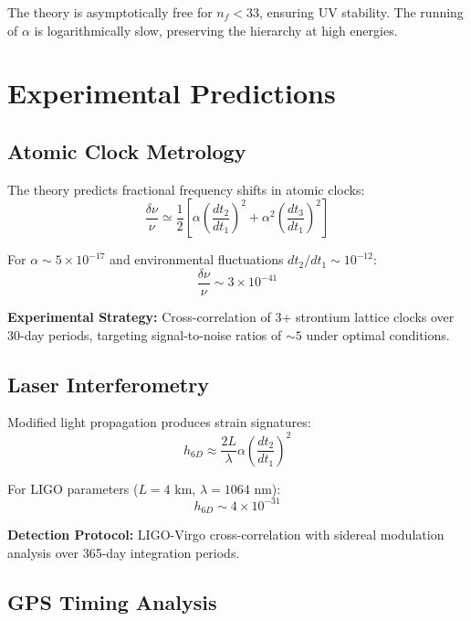 \documentclass[12pt,a4paper]{article}
\begin{document}
The theory is asymptotically free for $n_f < 33$, ensuring UV stability. The running of $\alpha$ is logarithmically slow, preserving the hierarchy at high energies.

\section{Experimental Predictions}
\label{sec:experimental_predictions}

\subsection{Atomic Clock Metrology}

The theory predicts fractional frequency shifts in atomic clocks:
\begin{equation}
\frac{\delta\nu}{\nu} \simeq \frac{1}{2}\left[\alpha\left(\frac{dt_2}{dt_1}\right)^2 + \alpha^2\left(\frac{dt_3}{dt_1}\right)^2\right]
\label{eq:clock_shift}
\end{equation}

For $\alpha \sim 5 \times 10^{-17}$ and environmental fluctuations $dt_2/dt_1 \sim 10^{-12}$:
\begin{equation}
\frac{\delta\nu}{\nu} \sim 3 \times 10^{-41}
\end{equation}

\textbf{Experimental Strategy:} Cross-correlation of 3+ strontium lattice clocks over 30-day periods, targeting signal-to-noise ratios of $\sim 5$ under optimal conditions.

\subsection{Laser Interferometry}

Modified light propagation produces strain signatures:
\begin{equation}
h_{6D} \approx \frac{2L}{\lambda} \alpha \left(\frac{dt_2}{dt_1}\right)^2
\label{eq:strain_6d}
\end{equation}

For LIGO parameters ($L = 4$ km, $\lambda = 1064$ nm):
\begin{equation}
h_{6D} \sim 4 \times 10^{-31}
\end{equation}

\textbf{Detection Protocol:} LIGO-Virgo cross-correlation with sidereal modulation analysis over 365-day integration periods.

\subsection{GPS Timing Analysis}
\end{document}
